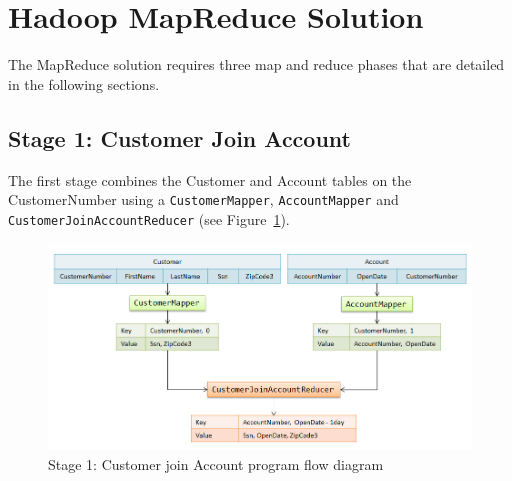 \section{Hadoop MapReduce Solution}
The MapReduce solution requires three map and reduce phases that are detailed in the following sections. 

\subsection{Stage 1: Customer Join Account}
The first stage combines the Customer and Account tables on the CustomerNumber using a \texttt{CustomerMapper}, \texttt{AccountMapper} and \texttt{CustomerJoinAccountReducer} (see Figure~\ref{fig:stage1}). 

\begin{figure}[hct]
 \centering
 \includegraphics[scale=0.60,bb=0 0 698 341]{../images/StageOne.png}
  \caption{Stage 1: Customer join Account program flow diagram}
  \label{fig:stage1}
\end{figure}

